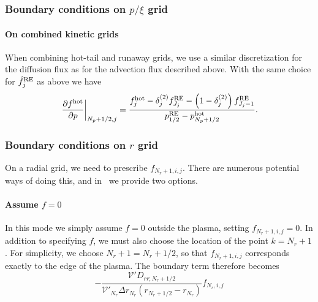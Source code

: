 \documentclass{notes}
\newcommand{\Vp}{\mathcal{V}'}
\begin{document}
	\subsubsection{Boundary conditions on $p/\xi$ grid}

    \paragraph{On combined kinetic grids}
    When combining hot-tail and runaway grids, we use a similar discretization
    for the diffusion flux as for the advection flux described above. With the
    same choice for $\hat{f}^{\rm RE}_j$ as above we have
    \begin{equation}
        \left.\frac{\partial f^{\rm hot}}{\partial p}\right|_{N_p+1/2,j} =
            \frac{f^{\rm hot}_j - \delta^{(2)}_j f_{J_j}^{\rm RE} -
            \left( 1 - \delta^{(2)}_j \right) f^{\rm RE}_{J_j-1}}
            {p^{\rm RE}_{1/2} - p^{\rm hot}_{N_p+1/2}}.
    \end{equation}

    \subsubsection{Boundary conditions on $r$ grid}
    On a radial grid, we need to prescribe $f_{N_r+1,i,j}$. There are numerous
    potential ways of doing this, and in \DREAM\ we provide two options.

    \paragraph{Assume $f=0$}
    In this mode we simply assume $f = 0$ outside the plasma, setting
    $f_{N_r+1,i,j}=0$. In addition to specifying $f$, we must also choose the
    location of the point $k=N_r+1$. For simplicity, we choose $N_r+1=N_r+1/2$,
    so that $f_{N_r+1,i,j}$ corresponds exactly to the edge of the plasma. The
    boundary term therefore becomes
    \begin{equation}
        -\frac{\Vp D_{rr;N_r+1/2}}{\Vp_{N_r}\Delta r_{N_r}\left( r_{N_r+1/2}-r_{N_r} \right)}
        f_{N_r,i,j}
    \end{equation}
\end{document}
